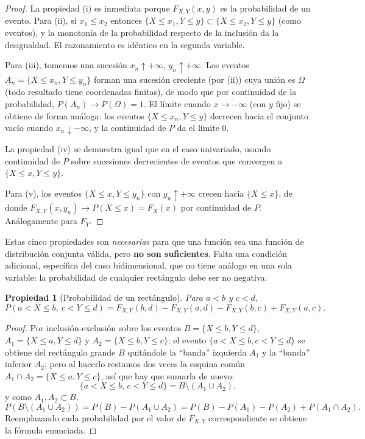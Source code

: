 \documentclass[11pt,a4paper]{article}
\theoremstyle{plain}
\newtheorem{propiedad}[teorema]{Propiedad}
\theoremstyle{definition}
\theoremstyle{remark}
\begin{document}
\begin{proof}
La propiedad (i) es inmediata porque $F_{X,Y}(x,y)$ es la probabilidad de un evento. Para (ii), si $x_1\le x_2$ entonces $\{X\le x_1, Y\le y\}\subset\{X\le x_2, Y\le y\}$ (como eventos), y la monotonía de la probabilidad respecto de la inclusión da la desigualdad. El razonamiento es idéntico en la segunda variable.

Para (iii), tomemos una sucesión $x_n\uparrow+\infty$, $y_n\uparrow+\infty$. Los eventos $A_n=\{X\le x_n, Y\le y_n\}$ forman una sucesión creciente (por (ii)) cuya unión es $\Omega$ (todo resultado tiene coordenadas finitas), de modo que por continuidad de la probabilidad, $P(A_n)\to P(\Omega)=1$. El límite cuando $x\to-\infty$ (con $y$ fijo) se obtiene de forma análoga: los eventos $\{X\le x_n, Y\le y\}$ decrecen hacia el conjunto vacío cuando $x_n\downarrow-\infty$, y la continuidad de $P$ da el límite $0$.

La propiedad (iv) se demuestra igual que en el caso univariado, usando continuidad de $P$ sobre sucesiones decrecientes de eventos que convergen a $\{X\le x, Y\le y\}$.

Para (v), los eventos $\{X\le x, Y\le y_n\}$ con $y_n\uparrow+\infty$ crecen hacia $\{X\le x\}$, de donde $F_{X,Y}(x,y_n)\to P(X\le x)=F_X(x)$ por continuidad de $P$. Análogamente para $F_Y$.
\end{proof}

Estas cinco propiedades son \emph{necesarias} para que una función sea una función de distribución conjunta válida, pero \textbf{no son suficientes}. Falta una condición adicional, específica del caso bidimensional, que no tiene análogo en una sola variable: la probabilidad de cualquier rectángulo debe ser no negativa.

\begin{propiedad}[Probabilidad de un rectángulo]\label{prop:rectangulo}
Para $a<b$ y $c<d$,
\[
P(a<X\le b,\ c<Y\le d) = F_{X,Y}(b,d) - F_{X,Y}(a,d) - F_{X,Y}(b,c) + F_{X,Y}(a,c).
\]
\end{propiedad}

\begin{proof}
Por inclusión-exclusión sobre los eventos $B=\{X\le b, Y\le d\}$, $A_1 = \{X\le a, Y\le d\}$ y $A_2 = \{X\le b, Y\le c\}$: el evento $\{a<X\le b, c<Y\le d\}$ se obtiene del rectángulo grande $B$ quitándole la ``banda'' izquierda $A_1$ y la ``banda'' inferior $A_2$; pero al hacerlo restamos dos veces la esquina común $A_1\cap A_2=\{X\le a, Y\le c\}$, así que hay que sumarla de nuevo:
\[
\{a<X\le b,\, c<Y\le d\} = B \setminus (A_1\cup A_2),
\]
y como $A_1, A_2\subset B$,
\[
P(B\setminus(A_1\cup A_2)) = P(B) - P(A_1\cup A_2) = P(B) - P(A_1)-P(A_2)+P(A_1\cap A_2).
\]
Reemplazando cada probabilidad por el valor de $F_{X,Y}$ correspondiente se obtiene la fórmula enunciada.
\end{proof}
\end{document}
